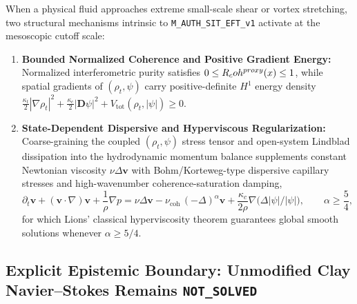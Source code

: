 When a physical fluid approaches extreme small-scale shear or vortex stretching, two structural mechanisms intrinsic to \texttt{M\_AUTH\_SIT\_EFT\_v1} activate at the mesoscopic cutoff scale:
\begin{enumerate}[leftmargin=2em]
  \item \textbf{Bounded Normalized Coherence and Positive Gradient Energy:} Normalized interferometric purity satisfies $0 \le R_coh^{proxy}(x) \le 1$, while spatial gradients of $(\rho_t, \psi)$ carry positive-definite $H^1$ energy density $\frac{\kappa_t}{2}|\nabla\rho_t|^2 + \frac{\kappa_c}{2}|\mathbf{D}\psi|^2 + V_{\mathrm{tot}}(\rho_t,|\psi|) \ge 0$.
  \item \textbf{State-Dependent Dispersive and Hyperviscous Regularization:} Coarse-graining the coupled $(\rho_t, \psi)$ stress tensor and open-system Lindblad dissipation into the hydrodynamic momentum balance supplements constant Newtonian viscosity $\nu\Delta\mathbf{v}$ with Bohm/Korteweg-type dispersive capillary stresses and high-wavenumber coherence-saturation damping,
  \begin{equation}
  \partial_t\mathbf{v} + (\mathbf{v}\cdot\nabla)\mathbf{v} + \frac{1}{\rho}\nabla p
  = \nu\Delta\mathbf{v} - \nu_{\mathrm{coh}}\,(-\Delta)^\alpha\mathbf{v} + \frac{\kappa_c}{2\rho}\nabla\bigl(\Delta|\psi|/|\psi|\bigr),
  \qquad \alpha \ge \frac{5}{4},
  \label{eq:sit_modified_navier_stokes}
  \end{equation}
  for which Lions' classical hyperviscosity theorem guarantees global smooth solutions whenever $\alpha \ge 5/4$.
\end{enumerate}

\subsection{Explicit Epistemic Boundary: Unmodified Clay Navier--Stokes Remains \texttt{NOT\_SOLVED}}

